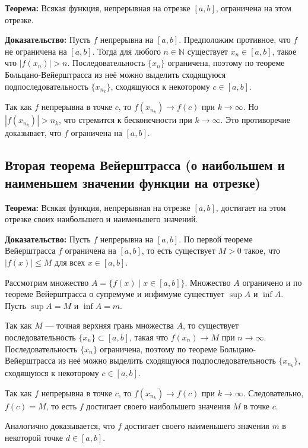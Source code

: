 \documentclass{article}
\begin{document}
\textbf{Теорема:} Всякая функция, непрерывная на отрезке \([a, b]\), ограничена на этом отрезке.

\textbf{Доказательство:} Пусть \( f \) непрерывна на \([a, b]\). Предположим противное, что \( f \) не ограничена на \([a, b]\). Тогда для любого \( n \in \mathbb{N} \) существует \( x_n \in [a, b] \), такое что \( |f(x_n)| > n \). Последовательность \( \{x_n\} \) ограничена, поэтому по теореме Больцано-Вейерштрасса из неё можно выделить сходящуюся подпоследовательность \( \{x_{n_k}\} \), сходящуюся к некоторому \( c \in [a, b] \).

Так как \( f \) непрерывна в точке \( c \), то \( f(x_{n_k}) \to f(c) \) при \( k \to \infty \). Но \( |f(x_{n_k})| > n_k \), что стремится к бесконечности при \( k \to \infty \). Это противоречие доказывает, что \( f \) ограничена на \([a, b]\).

\subsection*{Вторая теорема Вейерштрасса (о наибольшем и наименьшем значении функции на отрезке)}

\textbf{Теорема:} Всякая функция, непрерывная на отрезке \([a, b]\), достигает на этом отрезке своих наибольшего и наименьшего значений.

\textbf{Доказательство:} Пусть \( f \) непрерывна на \([a, b]\). По первой теореме Вейерштрасса \( f \) ограничена на \([a, b]\), то есть существует \( M > 0 \) такое, что \( |f(x)| \leq M \) для всех \( x \in [a, b] \).

Рассмотрим множество \( A = \{ f(x) \mid x \in [a, b] \} \). Множество \( A \) ограничено и по теореме Вейерштрасса о супремуме и инфимуме существует \( \sup A \) и \( \inf A \). Пусть \( \sup A = M \) и \( \inf A = m \).

Так как \( M \) — точная верхняя грань множества \( A \), то существует последовательность \( \{x_n\} \subset [a, b] \), такая что \( f(x_n) \to M \) при \( n \to \infty \). Последовательность \( \{x_n\} \) ограничена, поэтому по теореме Больцано-Вейерштрасса из неё можно выделить сходящуюся подпоследовательность \( \{x_{n_k}\} \), сходящуюся к некоторому \( c \in [a, b] \).

Так как \( f \) непрерывна в точке \( c \), то \( f(x_{n_k}) \to f(c) \) при \( k \to \infty \). Следовательно, \( f(c) = M \), то есть \( f \) достигает своего наибольшего значения \( M \) в точке \( c \).

Аналогично доказывается, что \( f \) достигает своего наименьшего значения \( m \) в некоторой точке \( d \in [a, b] \).
\end{document}
